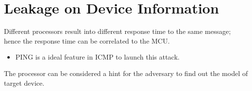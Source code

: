 \section{Leakage on Device Information}

Different processors result into different response time to the same message; hence the response time can be correlated to the MCU.

\begin{itemize}
	\item PING is a ideal feature in ICMP to launch this attack.
\end{itemize}

The processor can be considered a hint for the adversary to find out the model of target device.
